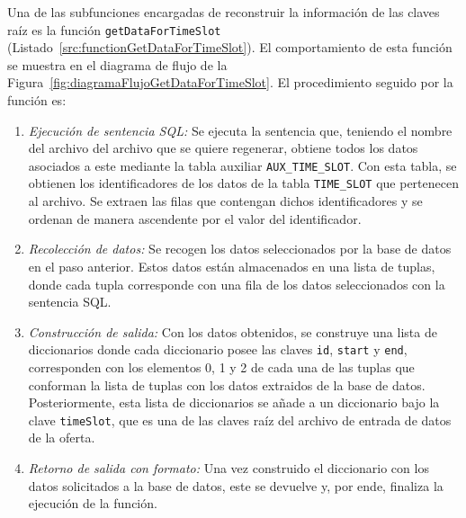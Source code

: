 Una de las subfunciones encargadas de reconstruir la información de las claves raíz es la función \texttt{getDataForTimeSlot} (Listado~\ref{src:functionGetDataForTimeSlot}). El comportamiento de esta función se muestra en el diagrama de flujo de la Figura~\ref{fig:diagramaFlujoGetDataForTimeSlot}. El procedimiento seguido por la función es:
    \begin{enumerate}
        \item \textit{Ejecución de sentencia \acrshort{SQL}:} Se ejecuta la sentencia que, teniendo el nombre del archivo del archivo que se quiere regenerar, obtiene todos los datos asociados a este mediante la tabla auxiliar \texttt{AUX\_TIME\_SLOT}. Con esta tabla, se obtienen los identificadores de los datos de la tabla \texttt{TIME\_SLOT} que pertenecen al archivo. Se extraen las filas que contengan dichos identificadores y se ordenan de manera ascendente por el valor del identificador.
        \item \textit{Recolección de datos:} Se recogen los datos seleccionados por la base de datos en el paso anterior. Estos datos están almacenados en una lista de tuplas, donde cada tupla corresponde con una fila de los datos seleccionados con la sentencia \acrshort{SQL}.
        \item \textit{Construcción de salida:} Con los datos obtenidos, se construye una lista de diccionarios donde cada diccionario posee las claves \texttt{id}, \texttt{start} y \texttt{end}, corresponden con los elementos 0, 1 y 2 de cada una de las tuplas que conforman la lista de tuplas con los datos extraidos de la base de datos. Posteriormente, esta lista de diccionarios se añade a un diccionario bajo la clave \texttt{timeSlot}, que es una de las claves raíz del archivo de entrada de datos de la oferta.
        \item \textit{Retorno de salida con formato:} Una vez construido el diccionario con los datos solicitados a la base de datos, este se devuelve y, por ende, finaliza la ejecución de la función.
    \end{enumerate}


